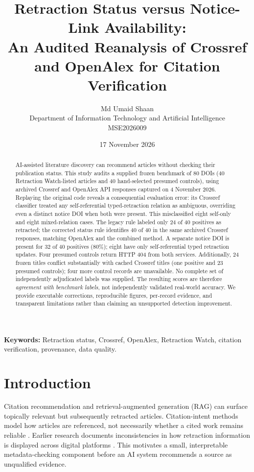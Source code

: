\documentclass[10pt,a4paper,twocolumn]{article}
\title{\bfseries Retraction Status versus Notice-Link Availability:\\ \large An Audited Reanalysis of Crossref and OpenAlex for Citation Verification}
\author{Md Umaid Shaan\\ Department of Information Technology and Artificial Intelligence\\ MSE2026009}
\date{17 November 2026}
\begin{document}
\maketitle
\begin{abstract}
AI-assisted literature discovery can recommend articles without checking their publication status. This study audits a supplied frozen benchmark of 80 DOIs (40 Retraction Watch-listed articles and 40 hand-selected presumed controls), using archived Crossref and OpenAlex API responses captured on 4 November 2026. Replaying the original code reveals a consequential evaluation error: its Crossref classifier treated any self-referential typed-retraction relation as ambiguous, overriding even a distinct notice DOI when both were present. This misclassified eight self-only and eight mixed-relation cases. The legacy rule labeled only 24 of 40 positives as retracted; the corrected status rule identifies 40 of 40 in the same archived Crossref responses, matching OpenAlex and the combined method. A separate notice DOI is present for 32 of 40 positives (80\%); eight have only self-referential typed retraction updates. Four presumed controls return HTTP 404 from both services. Additionally, 24 frozen titles conflict substantially with cached Crossref titles (one positive and 23 presumed controls); four more control records are unavailable. No complete set of independently adjudicated labels was supplied. The resulting scores are therefore \emph{agreement with benchmark labels}, not independently validated real-world accuracy. We provide executable corrections, reproducible figures, per-record evidence, and transparent limitations rather than claiming an unsupported detection improvement.
\end{abstract}
\noindent\textbf{Keywords:} Retraction status, Crossref, OpenAlex, Retraction Watch, citation verification, provenance, data quality.

\section{Introduction}
Citation recommendation and retrieval-augmented generation (RAG) can surface topically relevant but subsequently retracted articles. Citation-intent methods model how articles are referenced, not necessarily whether a cited work remains reliable \cite{cohan2019structural}. Earlier research documents inconsistencies in how retraction information is displayed across digital platforms \cite{frampton2021inconsistent}. This motivates a small, interpretable metadata-checking component before an AI system recommends a source as unqualified evidence.
\end{document}
